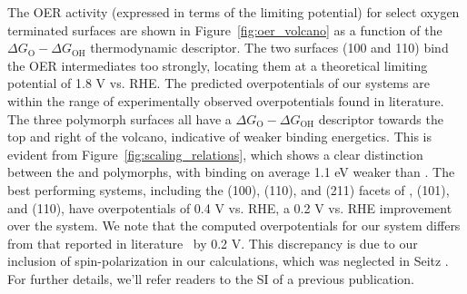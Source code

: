 The OER activity (expressed in terms of the limiting potential) for select oxygen terminated surfaces are shown in Figure~\ref{fig:oer_volcano} as a function of the $\Delta G_\mathrm{O} - \Delta G_\mathrm{OH}$ thermodynamic descriptor.
%
The two \rIrOtwo surfaces (100 and 110) bind the OER intermediates too strongly,
locating them at a theoretical limiting potential of \mytilde\num{1.8} V vs. RHE.
%
The predicted overpotentials of our \rIrOtwo systems are within the range of experimentally observed overpotentials found in literature.
%
The three \IrOthree polymorph surfaces all have a $\Delta G_\mathrm{O} - \Delta G_\mathrm{OH}$ descriptor towards the top and right of the volcano, indicative of weaker binding energetics.
%
This is evident from Figure~\ref{fig:scaling_relations}, which shows a clear distinction between the \IrOtwo and \IrOthree polymorphs, with \IrOthree binding on average 1.1 eV weaker than \IrOtwo.
%
The best performing systems, including the (100), (110), and (211) facets of \aIrOthree, \bIrOthree (101), and \rIrOthree (110), have overpotentials of \mytilde\num{0.4} V vs. RHE,
a \mytilde\num{0.2} V vs. RHE improvement over the \rIrOtwo system.
%
We note that the computed  overpotentials for our \rIrOtwo system differs from that reported in literature~\cite{Seitz2016} by \mytilde\num{0.2} V.
%
This discrepancy is due to our inclusion of spin-polarization in our  calculations, which was neglected in Seitz .
%
For further details, we'll refer readers to the SI of a previous publication.\cite{Strickler2019}


